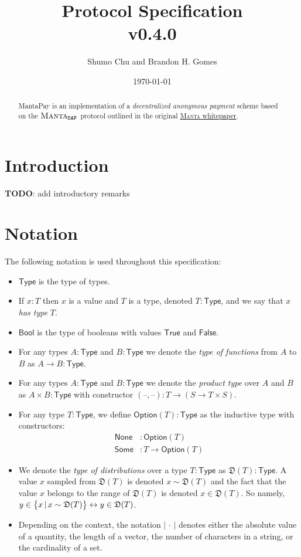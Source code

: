 \documentclass[a4paper]{article}
\title{\textbf{\MantaPay{} Protocol Specification}\\ v0.4.0}
\author{Shumo Chu and Brandon H. Gomes}
\date{\today}
\newcommand{\lsection}[2]{\def\sectionlabel{#2} \section{#1}\label{sec:#2}}
\newcommand{\TODO}[1]{{\color{red}\textbf{TODO}}: #1}
\theoremstyle{definition}
\newcommand{\dash}{{\textrm{--}}}
\renewcommand{\abs}[1]{\left|#1\right|}
\newcommand{\Bool}{{\textsf{Bool}}}
\newcommand{\False}{{\textsf{False}}}
\newcommand{\MantaDAP}{{\Manta{}_{\texttt{DAP}}}}
\newcommand{\MantaPay}{{\textsf{MantaPay}}}
\newcommand{\Manta}{{\textsc{Manta}}}
\newcommand{\None}{{\textsf{None}}}
\newcommand{\Option}{{\textsf{Option}}}
\newcommand{\Some}{{\textsf{Some}}}
\newcommand{\True}{{\textsf{True}}}
\newcommand{\Type}{{\textsf{Type}}}
\begin{document}
    
\maketitle

\begin{abstract}
    \MantaPay{} is an implementation of a \emph{decentralized anonymous payment} scheme based on the $\MantaDAP$ protocol outlined in the original \href{https://eprint.iacr.org/2021/743.pdf}{\Manta{} whitepaper}.
\end{abstract}
    
\tableofcontents

\lsection{Introduction}{introduction}

\TODO{add introductory remarks}

\lsection{Notation}{notation}

The following notation is used throughout this specification:

\begin{itemize}
    \item $\Type$ is the type of types\footnotemark{}.
    \item If $x : T$ then $x$ is a value and $T$ is a type, denoted $T : \Type$, and we say that $x$ \emph{has type} $T$.
    \item $\Bool$ is the type of booleans with values $\True$ and $\False$.
    \item For any types $A : \Type$ and $B : \Type$ we denote the \emph{type of functions} from $A$ to $B$ as $A \to B : \Type$.
    \item For any types $A : \Type$ and $B : \Type$ we denote the \emph{product type} over $A$ and $B$ as $A \times B : \Type$ with constructor $(\dash, \dash) : T \to (S \to T \times S)$.
    \item For any type $T : \Type$, we define $\Option(T) : \Type$ as the inductive type with constructors:
        \begin{align*}
            \None &: \Option(T) \\
            \Some &: T \to \Option(T)
        \end{align*}
    \item We denote the \emph{type of distributions} over a type $T : \Type$ as $\mathfrak{D}(T) : \Type$. A value $x$ sampled from $\mathfrak{D}(T)$ is denoted $x \sim \mathfrak{D}(T)$ and the fact that the value $x$ belongs to the range of $\mathfrak{D}(T)$ is denoted $x \in \mathfrak{D}(T)$. So namely, $y \in \set{x \,|\, x \sim \mathfrak{D}(T)} \leftrightarrow y \in \mathfrak{D}(T)$.
    \item Depending on the context, the notation $\abs{\,\cdot\,}$ denotes either the absolute value of a quantity, the length of a vector, the number of characters in a string, or the cardinality of a set.
\end{itemize}
\end{document}
